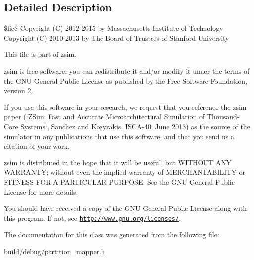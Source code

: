 \subsection{Detailed Description}
\$lic\$ Copyright (C) 2012-\/2015 by Massachusetts Institute of Technology Copyright (C) 2010-\/2013 by The Board of Trustees of Stanford University

This file is part of zsim.

zsim is free software; you can redistribute it and/or modify it under the terms of the G\-N\-U General Public License as published by the Free Software Foundation, version 2.

If you use this software in your research, we request that you reference the zsim paper (\char`\"{}\-Z\-Sim\-: Fast and Accurate Microarchitectural Simulation of
\-Thousand-\/\-Core Systems\char`\"{}, Sanchez and Kozyrakis, I\-S\-C\-A-\/40, June 2013) as the source of the simulator in any publications that use this software, and that you send us a citation of your work.

zsim is distributed in the hope that it will be useful, but W\-I\-T\-H\-O\-U\-T A\-N\-Y W\-A\-R\-R\-A\-N\-T\-Y; without even the implied warranty of M\-E\-R\-C\-H\-A\-N\-T\-A\-B\-I\-L\-I\-T\-Y or F\-I\-T\-N\-E\-S\-S F\-O\-R A P\-A\-R\-T\-I\-C\-U\-L\-A\-R P\-U\-R\-P\-O\-S\-E. See the G\-N\-U General Public License for more details.

You should have received a copy of the G\-N\-U General Public License along with this program. If not, see \href{http://www.gnu.org/licenses/}{\tt http\-://www.\-gnu.\-org/licenses/}. 

The documentation for this class was generated from the following file\-:\begin{DoxyCompactItemize}
\item 
build/debug/partition\-\_\-mapper.\-h\end{DoxyCompactItemize}
